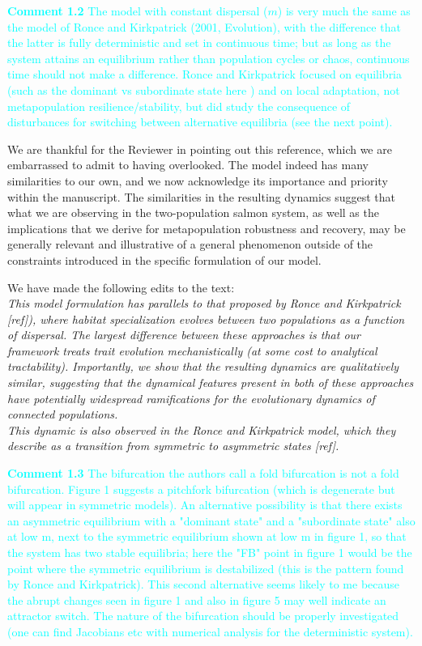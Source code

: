 \documentclass[ucm,12pt]{ucletter}
\begin{document}
\begin{letter}
\noindent \textcolor{cyan}{
{\bf Comment 1.2} The model with constant dispersal ($m$) is very much the same as the model of Ronce and Kirkpatrick (2001, Evolution), with the difference that the latter is fully deterministic and set in continuous time; but as long as the system attains an equilibrium rather than population cycles or chaos, continuous time should not make a difference. Ronce and Kirkpatrick focused on equilibria (such as the dominant vs subordinate state here ) and on local adaptation, not metapopulation resilience/stability, but did study the consequence of disturbances for switching between alternative equilibria (see the next point).
}

 We are thankful for the Reviewer in pointing out this reference, which we are embarrassed to admit to having overlooked. The model indeed has many similarities to our own, and we now acknowledge its importance and priority within the manuscript. The similarities in the resulting dynamics suggest that what we are observing in the two-population salmon system, as well as the implications that we derive for metapopulation robustness and recovery, may be generally relevant and illustrative of a general phenomenon outside of the constraints introduced in the specific formulation of our model.

\noindent We have made the following edits to the text:\\
 \emph{This model formulation has parallels to that proposed by Ronce and Kirkpatrick [ref]), where habitat specialization evolves between two populations as a function of dispersal.
The largest difference between these approaches is that our framework treats trait evolution mechanistically (at some cost to analytical tractability).
Importantly, we show that the resulting dynamics are qualitatively similar, suggesting that the dynamical features present in both of these approaches have potentially widespread ramifications for the evolutionary dynamics of connected populations.}\\
 \emph{This dynamic is also observed in the Ronce and Kirkpatrick model, which they describe as a transition from symmetric to asymmetric states [ref].}


\noindent \textcolor{cyan}{
{\bf Comment 1.3} The bifurcation the authors call a fold bifurcation is not a fold bifurcation. Figure 1 suggests a pitchfork bifurcation (which is degenerate but will appear in symmetric models). An alternative possibility is that there exists an asymmetric equilibrium with a "dominant state" and a "subordinate state" also at low m, next to the symmetric equilibrium shown at low m in figure 1, so that the system has two stable equilibria; here the "FB" point in figure 1 would be the point where the symmetric equilibrium is destabilized (this is the pattern found by Ronce and Kirkpatrick). This second alternative seems likely to me because the abrupt changes seen in figure 1 and also in figure 5 may well indicate an attractor switch. The nature of the bifurcation should be properly investigated (one can find Jacobians etc with numerical analysis for the deterministic system).
}


\end{letter}
\end{document}
